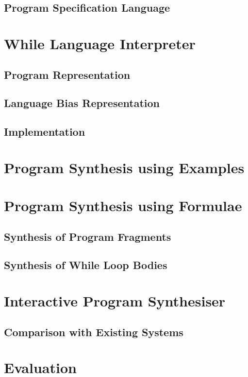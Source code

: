 \documentclass[a4paper,twoside,notitlepage]{article}
\begin{document}
\subsection{Program Specification Language}

\section{While Language Interpreter}
\subsection{Program Representation}
\subsection{Language Bias Representation}
\subsection{Implementation}

\section{Program Synthesis using Examples}

\section{Program Synthesis using Formulae}
\subsection{Synthesis of Program Fragments}
\subsection{Synthesis of While Loop Bodies}

\section{Interactive Program Synthesiser}

\subsection{Comparison with Existing Systems}

\section{Evaluation}
\end{document}
